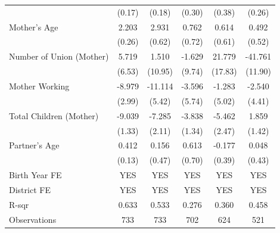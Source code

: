 \begin{longtable}{l*{5}{c}}
                    & (0.17) & (0.18) & (0.30) & (0.38) & (0.26) \\
Mother's Age & 2.203\sym{***} & 2.931\sym{***} & 0.762 & 0.614 & 0.492 \\
                    & (0.26) & (0.62) & (0.72) & (0.61) & (0.52) \\
Number of Union (Mother) & 5.719 & 1.510 & -1.629 & 21.779 & -41.761\sym{***} \\
                    & (6.53) & (10.95) & (9.74) & (17.83) & (11.90) \\
Mother Working & -8.979\sym{***} & -11.114\sym{**} & -3.596 & -1.283 & -2.540 \\
                    & (2.99) & (5.42) & (5.74) & (5.02) & (4.41) \\
Total Children (Mother) & -9.039\sym{***} & -7.285\sym{***} & -3.838\sym{***} & -5.462\sym{**} & 1.859 \\
                    & (1.33) & (2.11) & (1.34) & (2.47) & (1.42) \\
Partner's Age & 0.412\sym{***} & 0.156 & 0.613 & -0.177 & 0.048 \\
                    & (0.13) & (0.47) & (0.70) & (0.39) & (0.43) \\
\hline
Birth Year FE & YES & YES & YES & YES & YES \\
District FE & YES & YES & YES & YES & YES \\
R-sqr & 0.633 & 0.533 & 0.276 & 0.360 & 0.458 \\
Observations & 733 & 733 & 702 & 624 & 521 \\
\hline\hline
\end{longtable}